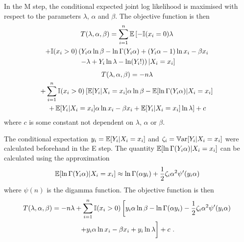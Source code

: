 In the M step, the conditional expected joint log likelihood is maximised with respect to the parameters $\lambda$, $\alpha$ and $\beta$. The objective function is then
\begin{multline*}
  T(\lambda,\alpha,\beta)=
  \sum_{i=1}^n
  \operatorname{\mathbb{E}}\left[
    -\mathbb{I}(x_i=0)
    \lambda
  \right.
  \\
  \left.+
    \mathbb{I}(x_i>0)
    \left(
      Y_i\alpha\ln\beta-\ln\Gamma(Y_i\alpha)+(Y_i\alpha-1)\ln x_i - \beta x_i
    \right.
  \right.
  \\
  \left.
    \left.  
      - \lambda + Y_i \ln \lambda - \ln(Y_i!)
    \right)
    |X_i=x_i
  \right]
\end{multline*}
\begin{multline}
  T(\lambda,\alpha,\beta)=
  -n\lambda
  \\
  +\sum_{i=1}^n
  \mathbb{I}(x_i>0)
  \left[
    \operatorname{\mathbb{E}}[Y_i|X_i=x_i]\alpha\ln\beta-\operatorname{\mathbb{E}}[\ln\Gamma(Y_i\alpha)|X_i=x_i]
  \right.
  \\
  \left.
    +\operatorname{\mathbb{E}}[Y_i|X_i=x_i]\alpha\ln x_i - \beta x_i
    + \operatorname{\mathbb{E}}[Y_i|X_i=x_i] \ln \lambda
  \right] + c
\end{multline}
where $c$ is some constant not dependent on $\lambda$, $\alpha$ or $\beta$.

The conditional expectation $y_i = \operatorname{\mathbb{E}}[Y_i|X_i=x_i]$ and $\zeta_i = \operatorname{\mathbb{V}ar}[Y_i|X_i=x_i]$ were calculated beforehand in the E step. The quantity $\operatorname{\mathbb{E}}[\ln\Gamma(Y_i\alpha)|X_i=x_i]$ can be calculated using the approximation
\begin{equation}
  \operatorname{\mathbb{E}}[\ln\Gamma(Y_i\alpha)|X_i=x_i] \approx
  \ln\Gamma(\alpha y_i) + \frac{1}{2}\zeta_i\alpha^2\psi'(y_i\alpha)
\end{equation}
where $\psi(n)$ is the digamma function. The objective function is then
\begin{multline}
  T(\lambda,\alpha,\beta)=
  -n\lambda
  +\sum_{i=1}^n
  \mathbb{I}(x_i>0)
  \left[
    y_i\alpha\ln\beta-\ln\Gamma(\alpha y_i) - \frac{1}{2}\zeta_i\alpha^2\psi'(y_i\alpha)
  \right.
  \\
  \left.
    +y_i\alpha\ln x_i - \beta x_i
    + y_i \ln \lambda
    \vphantom{\frac{1}{1}}
  \right]
  + c
  \ .
\end{multline}

